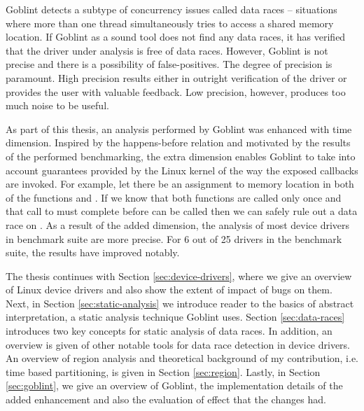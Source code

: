 \documentclass[..thesis.tex]{subfiles}
\begin{document}
Goblint detects a subtype of concurrency issues called data races -- situations where more than one thread simultaneously tries to access a shared memory location.
If Goblint as a sound tool does not find any data races, it has verified that the driver under analysis is free of data races. 
However, Goblint is not precise and there is a possibility of false-positives. The degree of precision is paramount. High precision results either in outright verification of the driver or provides the user with valuable feedback. Low precision, however, produces too much noise to be useful.
  

As part of this thesis, an analysis performed by Goblint was enhanced with time dimension. Inspired by the happens-before relation and motivated by the results of the performed benchmarking,
the extra dimension enables Goblint to take into account guarantees provided by the Linux kernel of the way the exposed callbacks are invoked.
For example, let there be an assignment to memory location  in both of the functions  and . 
If we know that both functions are called only once and that call to  must complete before  can be called then we can safely rule out a data race on .
As a result of the added dimension, the analysis of most device drivers in benchmark suite are more precise. For 6 out of 25 drivers in the benchmark suite,
the results have improved notably.


The thesis continues with Section \ref{sec:device-drivers}, where we give an overview of Linux device drivers and also show the extent of impact of bugs on them.
Next, in Section \ref{sec:static-analysis} we introduce reader to the basics of abstract interpretation, a static analysis technique Goblint uses.
Section \ref{sec:data-races} introduces two key concepts for static analysis of data races.
In addition, an overview is given of other notable tools for data race detection in device drivers. An overview of region analysis and theoretical background of my contribution, i.e.
time based partitioning, is given in Section \ref{sec:region}. Lastly, in Section \ref{sec:goblint}, we give an overview of Goblint,
the implementation details of the added enhancement and also the evaluation of effect that the changes had.  
\end{document}

